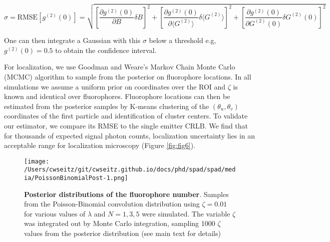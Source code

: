 \begin{equation}
\sigma = \text{RMSE}[g^{(2)}(0)] = \sqrt{
    \left[
    \frac{\partial g^{(2)}(0)}{\partial B} \delta B
    \right]^2 +
    \left[
    \frac{\partial g^{(2)}(0)}{\partial \langle G^{(2)} \rangle} \delta \langle G^{(2)} \rangle
    \right]^2 +
    \left[
    \frac{\partial g^{(2)}(0)}{\partial G^{(2)}(0)} \delta G^{(2)}(0)
    \right]^2
}
\end{equation}

One can then integrate a Gaussian with this $\sigma$ below a threshold e.g, $g^{(2)}(0)=0.5$ to obtain the confidence interval.

For localization, we use Goodman and Weare's Markov Chain Monte Carlo (MCMC) algorithm \parencite{Goodman2010} to sample from the posterior on fluorophore locations. In all simulations we assume a uniform prior on coordinates over the ROI and $\zeta$ is known and identical over fluorophores. Fluorophore locations can then be estimated from the posterior samples by K-means clustering of the $(\theta_u,\theta_v)$ coordinates of the first particle and identification of cluster centers. To validate our estimator, we compare its RMSE to the single emitter CRLB. We find that for thousands of expected signal photon counts, localization uncertainty lies in an acceptable range for localization microscopy (Figure \ref{fig:fig6}).

\begin{figure*}[t]
\centering
\texttt{[image: /Users/cwseitz/git/cwseitz.github.io/docs/phd/spad/spad/media/PoissonBinomialPost-1.png]}
\caption{\textbf{Posterior distributions of the fluorophore number}. Samples from the Poisson-Binomial convolution distribution using $\zeta=0.01$ for various values of $\lambda$ and $N=1,3,5$ were simulated. The variable $\zeta$ was integrated out by Monte Carlo integration, sampling 1000 $\zeta$ values from the posterior distribution (see main text for details)}
\label{fig:fig9}
\end{figure*}    


